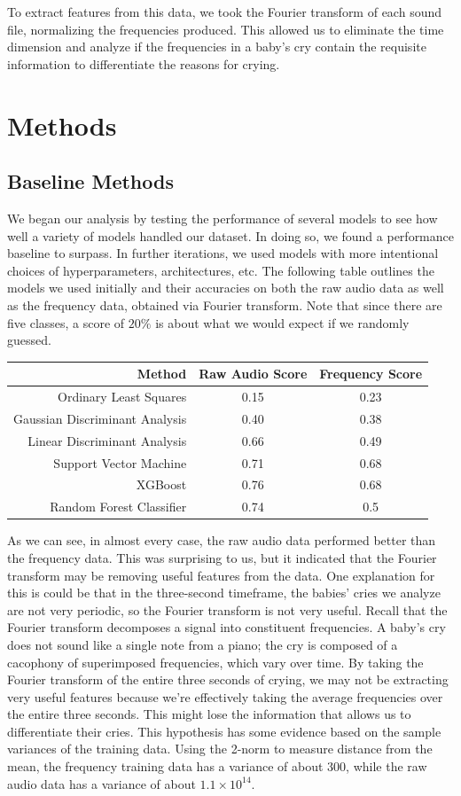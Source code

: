 \documentclass[11pt]{article}
\begin{document}
To extract features from this data, we took the Fourier transform of each sound file, normalizing the frequencies produced.
This allowed us to eliminate the time dimension and analyze if the frequencies in a baby's cry contain the requisite information to differentiate the reasons for crying.


\section{Methods}
\subsection{Baseline Methods}
We began our analysis by testing the performance of several models to see how well a variety of models handled our dataset.
In doing so, we found a performance baseline to surpass.
In further iterations, we used models with more intentional choices of hyperparameters, architectures, etc.
The following table outlines the models we used initially and their accuracies on both the raw audio data as well as the frequency data, obtained via Fourier transform.
Note that since there are five classes, a score of $20\%$ is about what we would expect if we randomly guessed.
\begin{center}
   \begin{tabular}{| r | c | c |}
      \hline
      \textbf{Method} & \textbf{Raw Audio Score} & \textbf{Frequency Score}  \\
      \hline
      Ordinary Least Squares & 0.15 & 0.23 \\
      Gaussian Discriminant Analysis & 0.40 & 0.38 \\
      Linear Discriminant Analysis & 0.66 & 0.49 \\
      Support Vector Machine & 0.71 &  0.68\\
      XGBoost & 0.76 & 0.68 \\
      Random Forest Classifier & 0.74 & 0.5\\
      \hline
   \end{tabular}
\end{center}
As we can see, in almost every case, the raw audio data performed better than the frequency data.
This was surprising to us, but it indicated that the Fourier transform may be removing useful features from the data.
One explanation for this is could be that in the three-second timeframe, the babies' cries we analyze are not very periodic, so the Fourier transform is not very useful.
Recall that the Fourier transform decomposes a signal into constituent frequencies.
A baby's cry does not sound like a single note from a piano; the cry is composed of a cacophony of superimposed frequencies, which vary over time.
By taking the Fourier transform of the entire three seconds of crying, we may not be extracting very useful features because we're effectively taking the average frequencies over the entire three seconds.
This might lose the information that allows us to differentiate their cries.
This hypothesis has some evidence based on the sample variances of the training data.
Using the 2-norm to measure distance from the mean, the frequency training data has a variance of about $ 300 $, while the raw audio data has a variance of about $ 1.1 \times 10^{14} $.
\end{document}
